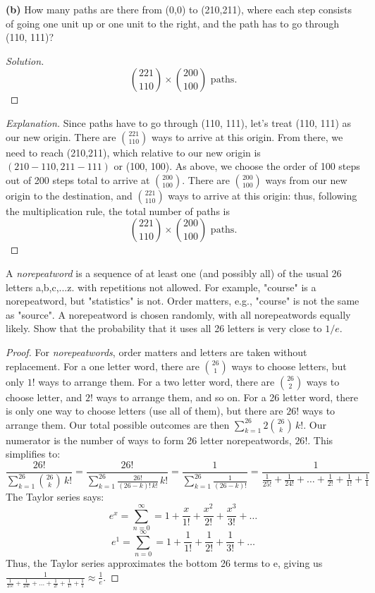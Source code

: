 \documentclass[10pt]{article}
\newenvironment{problem}[2][Problem]{\begin{trivlist}
\item[\hskip \labelsep {\bfseries #1}\hskip \labelsep {\bfseries #2.}]}{\end{trivlist}}
\begin{document}
\textbf{(b)} How many paths are there from (0,0) to (210,211), where each step consists of going one unit up or one unit to the right, and the path has to go through (110, 111)?


\begin{proof}[Solution]
\[
    \binom{221}{110} \times \binom{200}{100} \text{ paths.}
\]
\end{proof}

\begin{proof}[Explanation]

Since paths have to go through (110, 111), let's treat (110, 111) as our new origin. There are \(\binom{221}{110}\) ways to arrive at this origin. From there, we need to reach (210,211), which relative to our new origin is $(210 - 110, 211 - 111)$ or (100, 100). As above, we choose the order of 100 steps out of 200 steps total to arrive at \(\binom{200}{100}\). There are \(\binom{200}{100}\) ways from our new origin to the destination, and \(\binom{221}{110}\) ways to arrive at this origin: thus, following the multiplication rule, the total number of paths is
\[
    \binom{221}{110} \times \binom{200}{100} \text{ paths.}
\]

\end{proof}


\begin{problem}{4} 
A \textit{norepeatword} is a sequence of at least one (and possibly all) of the usual 26 letters a,b,c,...z. with repetitions not allowed. For example, "course" is a norepeatword, but "statistics" is not. Order matters, e.g., "course" is not the same as "source". A norepeatword is chosen randomly, with all norepeatwords equally likely. Show that the probability that it uses all 26 letters is very close to $1/e$.
\end{problem}

\begin{proof}[Proof]

For \textit{norepeatwords}, order matters and letters are taken without replacement. For a one letter word, there are \(\binom{26}{1}\) ways to choose letters, but only $1!$ ways to arrange them. For a two letter word, there are \(\binom{26}{2}\) ways to choose letter, and $2!$ ways to arrange them, and so on. For a 26 letter word, there is only one way to choose letters (use all of them), but there are $26!$ ways to arrange them. Our total possible outcomes are then $\sum^{26}_{k = 1}2\binom{26}{k} \, k!$. Our numerator is the number of ways to form 26 letter norepeatwords, $26!$. This simplifies to:
\[
    \frac{26!}{\sum^{26}_{k = 1}\binom{26}{k} \, k!} = \frac{26!}{\sum^{26}_{k = 1}\frac{26!}{(26-k)! \, k!} \, k!} = \frac{1}{\sum^{26}_{k = 1}\frac{1}{(26-k)!}} = \frac{1}{\frac{1}{25!} + \frac{1}{24!} + \ldots + \frac{1}{2!} + \frac{1}{1!} + \frac{1}{1}}
\]
The Taylor series says:
\[
   e^x = \sum^{\infty}_{n = 0} = 1 + \frac{x}{1!} + \frac{x^2}{2!} + \frac{x^3}{3!} + \ldots
\]
\[
   e^1 = \sum^{\infty}_{n = 0} = 1 + \frac{1}{1!} + \frac{1}{2!} + \frac{1}{3!} + \ldots
\]
Thus, the Taylor series approximates the bottom 26 terms to e, giving us \(\frac{1}{\frac{1}{25!} + \frac{1}{24!} + \ldots + \frac{1}{2!} + \frac{1}{1!} + \frac{1}{1}} \approx \frac{1}{e}\).
\end{proof}
\end{document}
